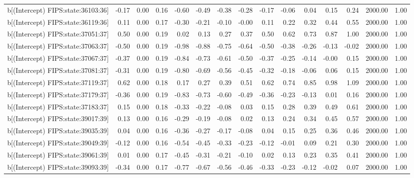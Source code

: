 \begin{table}[ht]
\begin{tabular}{rrrrrrrrrrrrrrr}
  b[(Intercept) FIPS:state:36103:36] & -0.17 & 0.00 & 0.16 & -0.60 & -0.49 & -0.38 & -0.28 & -0.17 & -0.06 & 0.04 & 0.15 & 0.24 & 2000.00 & 1.00 \\ 
  b[(Intercept) FIPS:state:36119:36] & 0.11 & 0.00 & 0.17 & -0.30 & -0.21 & -0.10 & -0.00 & 0.11 & 0.22 & 0.32 & 0.44 & 0.55 & 2000.00 & 1.00 \\ 
  b[(Intercept) FIPS:state:37051:37] & 0.50 & 0.00 & 0.19 & 0.02 & 0.13 & 0.27 & 0.37 & 0.50 & 0.62 & 0.73 & 0.87 & 1.00 & 2000.00 & 1.00 \\ 
  b[(Intercept) FIPS:state:37063:37] & -0.50 & 0.00 & 0.19 & -0.98 & -0.88 & -0.75 & -0.64 & -0.50 & -0.38 & -0.26 & -0.13 & -0.02 & 2000.00 & 1.00 \\ 
  b[(Intercept) FIPS:state:37067:37] & -0.37 & 0.00 & 0.19 & -0.84 & -0.73 & -0.61 & -0.50 & -0.37 & -0.25 & -0.14 & -0.00 & 0.15 & 2000.00 & 1.00 \\ 
  b[(Intercept) FIPS:state:37081:37] & -0.31 & 0.00 & 0.19 & -0.80 & -0.69 & -0.56 & -0.45 & -0.32 & -0.18 & -0.06 & 0.06 & 0.15 & 2000.00 & 1.00 \\ 
  b[(Intercept) FIPS:state:37119:37] & 0.62 & 0.00 & 0.18 & 0.17 & 0.27 & 0.39 & 0.51 & 0.62 & 0.74 & 0.85 & 0.98 & 1.09 & 2000.00 & 1.00 \\ 
  b[(Intercept) FIPS:state:37179:37] & -0.36 & 0.00 & 0.19 & -0.83 & -0.73 & -0.60 & -0.49 & -0.36 & -0.23 & -0.13 & 0.01 & 0.16 & 2000.00 & 1.00 \\ 
  b[(Intercept) FIPS:state:37183:37] & 0.15 & 0.00 & 0.18 & -0.33 & -0.22 & -0.08 & 0.03 & 0.15 & 0.28 & 0.39 & 0.49 & 0.61 & 2000.00 & 1.00 \\ 
  b[(Intercept) FIPS:state:39017:39] & 0.13 & 0.00 & 0.16 & -0.29 & -0.19 & -0.08 & 0.02 & 0.13 & 0.24 & 0.34 & 0.45 & 0.57 & 2000.00 & 1.00 \\ 
  b[(Intercept) FIPS:state:39035:39] & 0.04 & 0.00 & 0.16 & -0.36 & -0.27 & -0.17 & -0.08 & 0.04 & 0.15 & 0.25 & 0.36 & 0.46 & 2000.00 & 1.00 \\ 
  b[(Intercept) FIPS:state:39049:39] & -0.12 & 0.00 & 0.16 & -0.54 & -0.45 & -0.33 & -0.23 & -0.12 & -0.01 & 0.09 & 0.21 & 0.30 & 2000.00 & 1.00 \\ 
  b[(Intercept) FIPS:state:39061:39] & 0.01 & 0.00 & 0.17 & -0.45 & -0.31 & -0.21 & -0.10 & 0.02 & 0.13 & 0.23 & 0.35 & 0.41 & 2000.00 & 1.00 \\ 
  b[(Intercept) FIPS:state:39093:39] & -0.34 & 0.00 & 0.17 & -0.77 & -0.67 & -0.56 & -0.46 & -0.33 & -0.23 & -0.12 & -0.02 & 0.07 & 2000.00 & 1.00 \\ 

\end{tabular}
\end{table}
